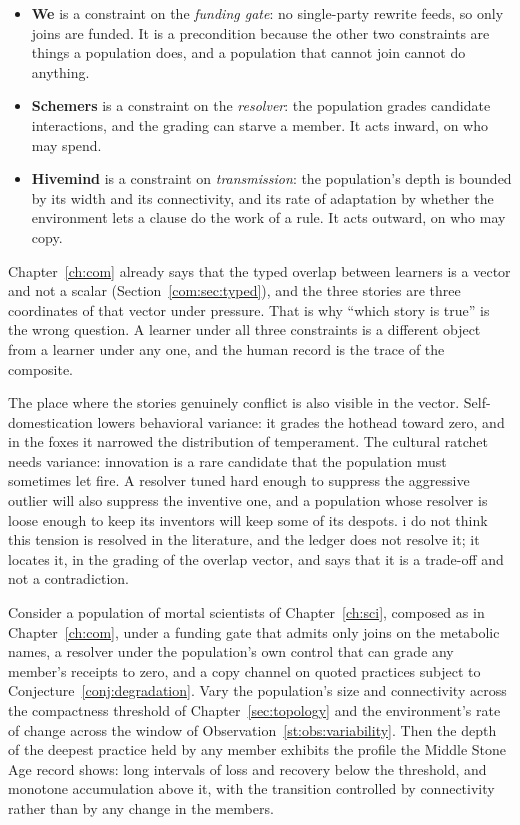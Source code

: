 \begin{itemize}[leftmargin=2em]
\item \textbf{We} is a constraint on the \emph{funding gate}: no single-party rewrite feeds, so only joins are funded. It is a precondition because the other two constraints are things a population does, and a population that cannot join cannot do anything.
\item \textbf{Schemers} is a constraint on the \emph{resolver}: the population grades candidate interactions, and the grading can starve a member. It acts inward, on who may spend.
\item \textbf{Hivemind} is a constraint on \emph{transmission}: the population's depth is bounded by its width and its connectivity, and its rate of adaptation by whether the environment lets a clause do the work of a rule. It acts outward, on who may copy.
\end{itemize}

\noindent
Chapter~\ref{ch:com} already says that the typed overlap between learners is a vector and not a scalar (Section~\ref{com:sec:typed}), and the three stories are three coordinates of that vector under pressure. That is why ``which story is true'' is the wrong question. A learner under all three constraints is a different object from a learner under any one, and the human record is the trace of the composite.

The place where the stories genuinely conflict is also visible in the vector. Self-domestication lowers behavioral variance: it grades the hothead toward zero, and in the foxes it narrowed the distribution of temperament. The cultural ratchet needs variance: innovation is a rare candidate that the population must sometimes let fire. A resolver tuned hard enough to suppress the aggressive outlier will also suppress the inventive one, and a population whose resolver is loose enough to keep its inventors will keep some of its despots. i do not think this tension is resolved in the literature, and the ledger does not resolve it; it locates it, in the grading of the overlap vector, and says that it is a trade-off and not a contradiction.

\begin{conjecture}
\label{st:conj:flicker}
Consider a population of mortal scientists of Chapter~\ref{ch:sci}, composed as in Chapter~\ref{ch:com}, under a funding gate that admits only joins on the metabolic names, a resolver under the population's own control that can grade any member's receipts to zero, and a copy channel on quoted practices subject to Conjecture~\ref{conj:degradation}. Vary the population's size and connectivity across the compactness threshold of Chapter~\ref{sec:topology} and the environment's rate of change across the window of Observation~\ref{st:obs:variability}. Then the depth of the deepest practice held by any member exhibits the profile the Middle Stone Age record shows: long intervals of loss and recovery below the threshold, and monotone accumulation above it, with the transition controlled by connectivity rather than by any change in the members.
\end{conjecture}

